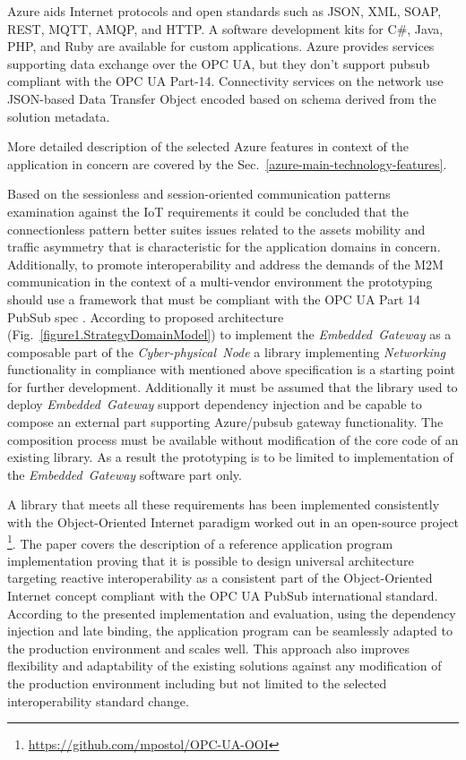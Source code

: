 \documentclass{jacsart}
\begin{document}
Azure aids Internet protocols and open standards such as JSON, XML, SOAP, REST, MQTT, AMQP, and HTTP. A software development kits for C\#, Java, PHP, and Ruby are available for custom applications. Azure provides services supporting data exchange over the OPC UA, but they don't support pubsub compliant with the OPC UA Part-14. Connectivity services on the network use JSON-based Data Transfer Object encoded based on schema derived from the solution metadata.

More detailed description of the selected Azure features in context of the application in concern are covered by the Sec.~\ref*{azure-main-technology-features}.

Based on the sessionless and session-oriented communication patterns examination against the IoT requirements \cite{mpostol2020} it could be concluded that the connectionless pattern better suites issues related to the assets mobility and traffic asymmetry that is characteristic for the application domains in concern. Additionally, to promote interoperability and address the demands of the M2M communication in the context of a multi-vendor environment the prototyping should use a framework that must be compliant with the OPC UA Part 14 PubSub spec \cite{RefWorks:doc:5d98837de4b055984c0eecf0}. According to proposed architecture (Fig.~\ref*{figure1.StrategyDomainModel}) to implement the \textit{Embedded\ Gateway} as a composable part of the \textit{Cyber-physical\ Node} a library implementing \textit{Networking} functionality in compliance with mentioned above specification is a starting point for further development. Additionally it must be assumed that the library used to deploy \textit{Embedded\ Gateway} support dependency injection and be capable to compose an external part supporting Azure/pubsub gateway functionality. The composition process must be available without modification of the core code of an existing library. As a result the prototyping is to be limited to implementation of the \textit{Embedded\ Gateway} software part only.

A library that meets all these requirements has been implemented consistently with the Object-Oriented Internet paradigm \cite{RefWorks:doc:5c66740ae4b081adf5804596} worked out in an open-source project \footnote{ \url{https://github.com/mpostol/OPC-UA-OOI} }. The paper \cite{mpostol2020} covers the description of a reference application program implementation proving that it is possible to design universal architecture targeting reactive interoperability as a consistent part of the Object-Oriented Internet concept compliant with the OPC UA PubSub \cite{RefWorks:doc:5d98837de4b055984c0eecf0} international standard. According to the presented implementation and evaluation, using the dependency injection and late binding, the application program can be seamlessly adapted to the production environment and scales well. This approach also improves flexibility and adaptability of the existing solutions against any modification of the production environment including but not limited to the selected interoperability standard change.
\end{document}
